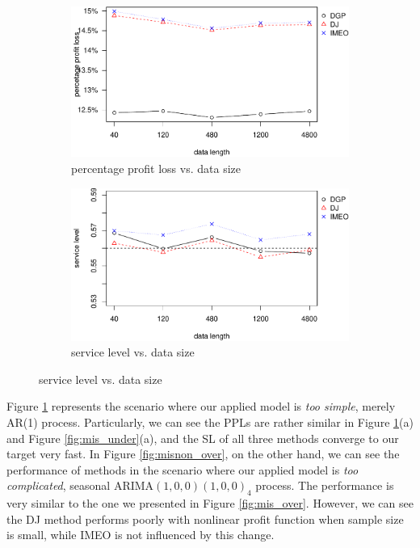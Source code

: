 \documentclass{article}
\begin{document}
\begin{figure}[ht]
\centering
\caption{Performance vs. sample size with under-paramaterised nonlinear model}
\begin{subfigure}[b]{0.48\textwidth}
\centering
\includegraphics[width=\textwidth]{information_non-plot_files/figure-latex/AR(1)ppl-1.pdf}
\caption{percentage profit loss vs. data size}
\end{subfigure}
\hfill
\begin{subfigure}[b]{0.48\textwidth}
\centering
\includegraphics[width=\textwidth]{information_non-plot_files/figure-latex/AR(1)sl-1.pdf}
\caption{service level vs. data size}
\end{subfigure}
\label{fig:misnon_under}
\end{figure}

Figure \ref{fig:misnon_under} represents the scenario where our applied model is \emph{too simple}, merely AR(1) process. Particularly, we can see the PPLs are rather similar in Figure \ref{fig:misnon_under}(a) and Figure \ref{fig:mis_under}(a), and the SL of all three methods converge to our target very fast. In Figure \ref{fig:misnon_over}, on the other hand, we can see the performance of methods in the scenario where our applied model is \emph{too complicated}, seasonal ARIMA$(1,0,0)(1,0,0)_4$ process. The performance is very similar to the one we presented in Figure \ref{fig:mis_over}. However, we can see the DJ method performs poorly with nonlinear profit function when sample size is small, while IMEO is not influenced by this change.
\end{document}
